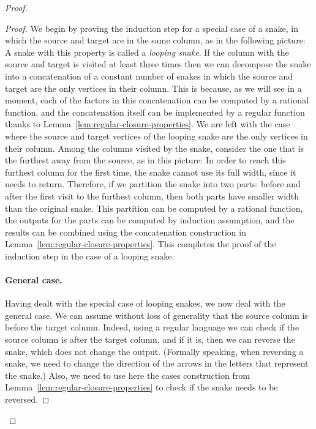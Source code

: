 \begin{proof}
\begin{proof}
We begin by proving the induction step for a special case of a snake, in which the source and target are in the same column, as in the following picture:
    A snake with this property is called a \emph{looping snake}. 
    If the column with the source and target is visited at least three times then we can decompose the snake into a concatenation of a constant number of snakes in which the source and target are the only vertices in their column. This is because, as we will see in a moment, each of the factors in this concatenation can be computed by a rational function, and the concatenation itself  can be implemented by a regular function thanks to Lemma~\ref{lem:regular-closure-properties}.
    We are left with the case where the source and target vertices of the looping snake are the only vertices in their column. Among the columns visited by the snake, consider the one that is the furthest away from the source, as in this picture:
    In order to reach this furthest column for the first time, the snake cannot use its full width, since it needs to return. Therefore, if we partition the snake into two parts: before and after the first visit to the furthest column, then both parts have smaller width than the original snake. This partition can be computed by a rational function, the outputs for the parts can be computed by induction assumption, and the results can be combined using the concatenation construction in Lemma~\ref{lem:regular-closure-properties}. This completes the proof of the induction step in the case of a looping snake. 
    

    \paragraph*{General case.} Having dealt with the special case of  looping snakes, we now deal with the general case.   We can assume without loss of generality that the source column is before the target column. Indeed, using a regular language we can check if the source column is after the target column, and if it is, then we can reverse the snake, which does not change the output. (Formally speaking, when reversing a snake, we need to change the direction of the arrows in the letters that represent the snake.) Also, we need to use here the cases construction from Lemma~\ref{lem:regular-closure-properties} to check if the snake needs to be reversed.
    

\end{proof}
\end{proof}
